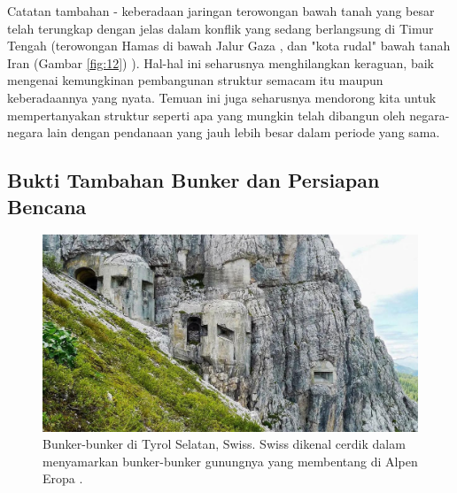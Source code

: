 \documentclass[10pt,twocolumn,letterpaper]{article}
\begin{document}
Catatan tambahan - keberadaan jaringan terowongan bawah tanah yang besar telah terungkap dengan jelas dalam konflik yang sedang berlangsung di Timur Tengah (terowongan Hamas di bawah Jalur Gaza \cite{38}, dan "kota rudal" bawah tanah Iran (Gambar \ref{fig:12}) \cite{39,40}). Hal-hal ini seharusnya menghilangkan keraguan, baik mengenai kemungkinan pembangunan struktur semacam itu maupun keberadaannya yang nyata. Temuan ini juga seharusnya mendorong kita untuk mempertanyakan struktur seperti apa yang mungkin telah dibangun oleh negara-negara lain dengan pendanaan yang jauh lebih besar dalam periode yang sama.

\subsection{Bukti Tambahan Bunker dan Persiapan Bencana}

\begin{figure}[t]
\begin{center}
   \includegraphics[width=1\linewidth]{tyrol.jpg}
\end{center}
   \caption{Bunker-bunker di Tyrol Selatan, Swiss. Swiss dikenal cerdik dalam menyamarkan bunker-bunker gunungnya yang membentang di Alpen Eropa \cite{32}.}
\label{fig:7}
\label{fig:onecol}
\end{figure}
\end{document}
